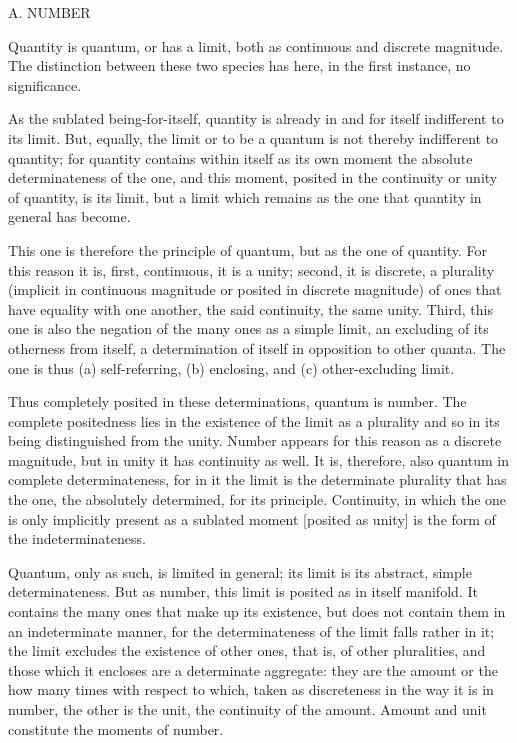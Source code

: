 
A. NUMBER

Quantity is quantum, or has a limit,
both as continuous and discrete magnitude.
The distinction between these two species has here,
in the first instance, no significance.

As the sublated being-for-itself,
quantity is already in and for itself
indifferent to its limit.
But, equally, the limit or to be a quantum is
not thereby indifferent to quantity;
for quantity contains within itself as its own moment
the absolute determinateness of the one,
and this moment, posited in the continuity
or unity of quantity, is its limit,
but a limit which remains as the one
that quantity in general has become.

This one is therefore the principle of quantum,
but as the one of quantity.
For this reason it is,
first, continuous, it is a unity;
second, it is discrete, a plurality
(implicit in continuous magnitude
or posited in discrete magnitude)
of ones that have equality with one another,
the said continuity, the same unity.
Third, this one is also the negation of
the many ones as a simple limit,
an excluding of its otherness from itself,
a determination of itself in opposition to other quanta.
The one is thus
(a) self-referring,
(b) enclosing, and
(c) other-excluding limit.

Thus completely posited in these determinations,
quantum is number.
The complete positedness lies in
the existence of the limit as a plurality
and so in its being distinguished from the unity.
Number appears for this reason as a discrete magnitude,
but in unity it has continuity as well.
It is, therefore, also quantum in complete determinateness,
for in it the limit is the determinate plurality
that has the one, the absolutely determined, for its principle.
Continuity, in which the one is only implicitly present
as a sublated moment [posited as unity] is
the form of the indeterminateness.

Quantum, only as such, is limited in general;
its limit is its abstract, simple determinateness.
But as number, this limit is posited as in itself manifold.
It contains the many ones that make up its existence,
but does not contain them in an indeterminate manner,
for the determinateness of the limit falls rather in it;
the limit excludes the existence of other ones,
that is, of other pluralities,
and those which it encloses are a determinate aggregate:
they are the amount or the how many times with respect to which,
taken as discreteness in the way it is in number,
the other is the unit, the continuity of the amount.
Amount and unit constitute the moments of number.

